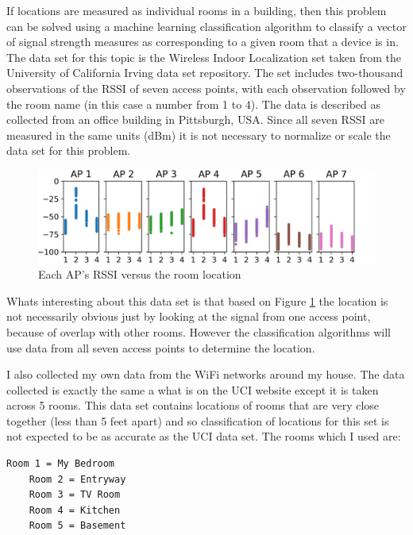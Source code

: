\documentclass[12pt,letterpaper]{article}
\begin{document}
\par If locations are measured as individual rooms in a building, then this problem can be solved using a machine learning classification algorithm to classify a vector of signal strength measures as corresponding to a given room that a device is in. The data set for this topic is the Wireless Indoor Localization set taken from the University of California Irving data set repository. The set includes two-thousand observations of the RSSI of seven access points, with each observation followed by the room name (in this case a number from 1 to 4). The data is described as collected from an office building in Pittsburgh, USA. Since all seven RSSI are measured in the same units (dBm) it is not necessary to normalize or scale the data set for this problem. 
\begin{figure}[H]

  \includegraphics[width=170mm]{gph.png}
  \caption{Each AP's RSSI versus the room location}
  \label{fig:RSSI}

\end{figure}
\par Whats interesting about this data set is that based on Figure \ref{fig:RSSI} the location is not necessarily obvious just by looking at the signal from one access point, because of overlap with other rooms. However the classification algorithms will use data from all seven access points to determine the location. 

\par I also collected my own data from the WiFi networks around my house. The data collected is exactly the same a what is on the UCI website except it is taken across 5 rooms. This data set contains locations of rooms that are very close together (less than 5 feet apart) and so classification of locations for this set is not expected to be as accurate as the UCI data set. The rooms which I used are:
\begin{lstlisting}[basicstyle=\ttm\linespread{.8}\small]
    Room 1 = My Bedroom
    Room 2 = Entryway
    Room 3 = TV Room
    Room 4 = Kitchen
    Room 5 = Basement
\end{lstlisting}
\end{document}
